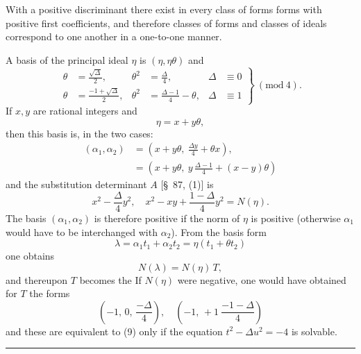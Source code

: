 

With a positive discriminant there exist in every class of forms forms with positive first coefficients, and therefore classes of forms and classes of ideals correspond to one another in a one-to-one manner.

A basis of the principal ideal $\eta$ is $(\eta, \eta\theta)$ and
\[
\left.\begin{aligned}
\theta &= \frac{\sqrt{\Delta}}{2}, & \theta^2 &= \frac{\Delta}{4}, & \Delta &\equiv 0\\
\theta &= \frac{-1+\sqrt{\Delta}}{2}, & \theta^2 &= \frac{\Delta-1}{4} - \theta, & \Delta &\equiv 1
\end{aligned}\right\}\ (\mathrm{mod}\ 4).
\]
If $x, y$ are rational integers and
\[
\eta = x + y\theta,
\]
then this basis is, in the two cases:
\[
\begin{aligned}
(\alpha_1, \alpha_2) &= \left(x + y\theta,\ \frac{\Delta y}{4} + \theta x\right),\\
&= \left(x + y\theta,\ y\,\frac{\Delta-1}{4} + (x-y)\theta\right)
\end{aligned}
\]
and the substitution determinant $A$ [\S\ 87, (1)] is
\[
x^2 - \frac{\Delta}{4}y^2, \quad x^2 - xy + \frac{1-\Delta}{4}y^2 = N(\eta).
\]
The basis $(\alpha_1, \alpha_2)$ is therefore positive if the norm of $\eta$ is positive (otherwise $\alpha_1$ would have to be interchanged with $\alpha_2$). From the basis form
\[
\lambda = \alpha_1 t_1 + \alpha_2 t_2 = \eta(t_1 + \theta t_2)
\]
one obtains
\[
N(\lambda) = N(\eta)\,T,
\]
and thereupon $T$ becomes the 
If $N(\eta)$ were negative, one would have obtained for $T$ the forms
\[
\left(-1,\,0,\,\frac{-\Delta}{4}\right), \quad \left(-1,\,+1\ \frac{-1-\Delta}{4}\right) %
\]
and these are equivalent to (9) only if the  equation $t^2 - \Delta u^2 = -4$ is solvable.

\rule{4cm}{0.4pt}
